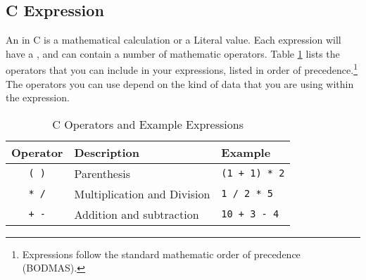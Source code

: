 \clearpage
\subsection{C Expression} %
\label{sub:program-creation-c_expression}

An  in C is a mathematical calculation or a Literal value. Each expression will have a , and can contain a number of mathematic operators. Table \ref{tbl:program-creation-c operators and expresions} lists the operators that you can include in your expressions, listed in order of precedence.\footnote{Expressions follow the standard mathematic order of precedence (BODMAS).} The operators you can use depend on the kind of data that you are using within the expression.

\begin{table}[h]
  \centering
  \begin{tabular}{|c|l|l|}
    \hline
    \textbf{Operator} & \textbf{Description} & \textbf{Example} \\
    \hline
    \texttt{ ( ) }     &   Parenthesis                 & \texttt{(1 + 1) * 2}  \\
    \texttt{* /}      &   Multiplication and Division & \texttt{1 / 2 * 5}    \\
    \texttt{+ -}      &   Addition and subtraction    & \texttt{10 + 3 - 4}   \\
    \hline
  \end{tabular}
  \caption{C Operators and Example Expressions}
  \label{tbl:program-creation-c operators and expresions}
\end{table}

